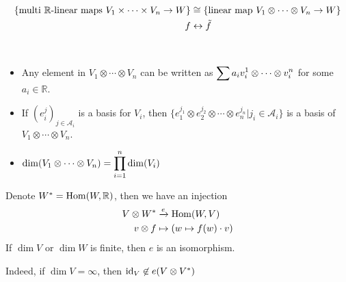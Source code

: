 \begin{corollary}
    \begin{equation}
        \begin{aligned}
            \{\text{multi  $ \mathbb{R} $-linear maps }V_1\times \cdots \times V_n\rightarrow W\}&\cong \{\text{linear map }V_1\otimes \cdots \otimes V_n\rightarrow W\}\\
            f&\leftrightarrow \tilde{f}
        \end{aligned}
    \end{equation}
\end{corollary}
\begin{proposition}
    \,\begin{itemize}
        \item Any element in  $ V_1\otimes \cdots \otimes V_n $ can be written as  $ \displaystyle\sum a_i\displaystyle v_i^1\otimes\cdots\otimes v_i^n$ for some  $ a_i\in\mathbb{R} $.
        \item If  $ (e_i^j)_{j\in \mathcal{A}_i} $ is a basis for  $ V_i $, then  $ \{e_1^{j_1}\otimes e_2^{j_2}\otimes \cdots \otimes e_{n}^{j_n}|j_i\in \mathcal{A}_i\} $ is a basis of  $ V_1\otimes \cdots \otimes V_n $.
        \item  $ \dim (V_1\otimes \cdots \otimes V_n)=\displaystyle\prod_{i=1}^n \dim(V_i) $    
    \end{itemize}
\end{proposition}
\begin{proposition}
    Denote  $ W^*=\mathrm{Hom}(W,\mathbb{R}) $, then  we have an injection 
    \begin{equation}
        \begin{aligned}
            V\otimes W^*&\xrightarrow{e}\mathrm{Hom}(W,V)\\
            v\otimes f&\mapsto \left(w\mapsto f(w)\cdot v\right) 
        \end{aligned}
    \end{equation}
    If  $ \dim V $ or  $ \dim W $ is finite, then  $ e $ is an isomorphism.
    
    Indeed, if  $ \dim V=\infty $, then  $ \mathrm{id}_V\not\in e(V\otimes V^*) $  
\end{proposition}
